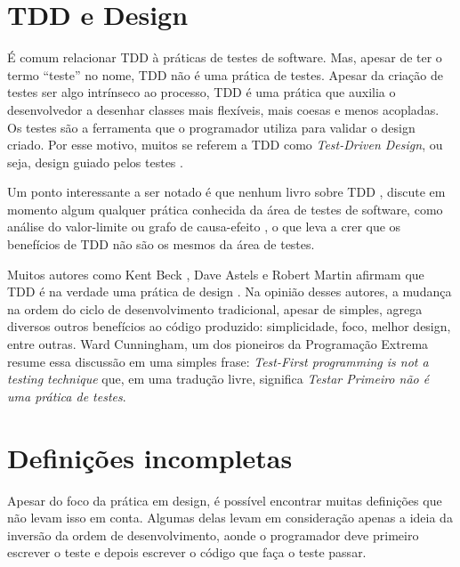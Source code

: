 \section{TDD e Design}
\label{cap:tdd-e-design}

É comum relacionar TDD à práticas de testes de software. Mas, apesar de ter o
termo ``teste'' no nome, TDD não é uma prática de testes.
Apesar da criação de testes ser algo intrínseco ao processo, TDD é uma prática
que auxilia o desenvolvedor a desenhar classes mais flexíveis, mais coesas e
menos acopladas. Os testes são a ferramenta que o programador utiliza para
validar o design criado. Por esse motivo, muitos se referem a TDD como
\textit{Test-Driven Design}, ou seja, design guiado pelos testes
\cite{tdd-taxonomy}.

Um ponto interessante a ser notado é que nenhum livro sobre TDD \cite{GOOS}
\cite{TDDByExample} \cite{astels-tdd}, discute em momento algum qualquer
prática conhecida da área de testes de software, como análise do valor-limite ou
grafo de causa-efeito \cite{art-of-sw-testing}, o que leva a crer que os
benefícios de TDD não são os mesmos da área de testes.

Muitos autores como Kent Beck \cite{aim-fire}, Dave Astels \cite{astels-tdd} e
Robert Martin \cite{bob-martin} afirmam que TDD é na verdade uma prática de
design \cite{tdd-taxonomy} \cite{aim-fire}.
Na opinião desses autores, a mudança na ordem do ciclo de
desenvolvimento tradicional, apesar de simples, agrega diversos outros
benefícios ao código produzido: simplicidade, foco, melhor design, entre outras.
Ward Cunningham, um dos pioneiros da Programação Extrema resume essa discussão
em uma simples frase: \textit{Test-First programming is not a testing technique}
que, em uma tradução livre, significa \textit{Testar Primeiro não é uma prática 
de testes}.

\section{Definições incompletas}

Apesar do foco da prática em design, é possível encontrar muitas definições que
não levam isso em conta. Algumas delas levam em consideração apenas a ideia da
inversão da ordem de desenvolvimento, aonde o programador deve primeiro escrever
o teste e depois escrever o código que faça o teste passar.

